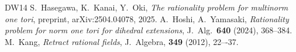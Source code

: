\documentclass[12pt]{amsart}
\theoremstyle{plain}
\theoremstyle{definition}
\numberwithin{thm}{section}
\numberwithin{equation}{section}
\begin{document}
\begin{thebibliography}{DW14}
S.~Hasegawa, K.~Kanai, Y.~Oki, \emph{The rationality problem for multinorm one tori}, preprint, arXiv:2504.04078, 2025. 
A.~Hoshi, A.~Yamasaki, \emph{Rationality problem for norm one tori for dihedral extensions}, J.~Alg.~\textbf{640} (2024), 368--384. 
M.~Kang, \emph{Retract rational fields}, J.~Algebra, \textbf{349} (2012), 22–-37.

\end{thebibliography}
\end{document}
